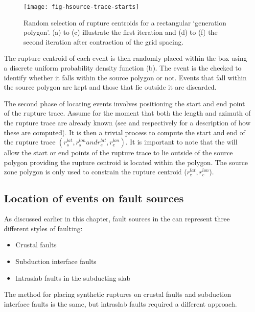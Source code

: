 \begin{figure}
\begin{center}
\texttt{[image: fig-hsource-trace-starts]}
\end{center}
\caption{Random selection of rupture centroids for a
rectangular `generation polygon'. (a) to (c) illustrate the first
iteration and (d) to (f) the second iteration after contraction of
the grid spacing.} \label{fig:source-trace-starts}
\end{figure}

The rupture centroid of each event is then randomly placed within the box 
using a discrete uniform probability density function
(b). The event is the checked to identify whether 
it falls within the source polygon or not. Events that fall within the source polygon 
are kept and those that lie outside it are discarded. 

The second phase of locating events involves positioning the start and end
point of the rupture trace. Assume for the moment that both the
length and azimuth of the rupture trace are already known (see
 and  respectively
for a description of how these are computed). It is then a trivial
process to compute the start and end of the rupture trace
$(r_s^{lat},r_s^{lon} and r_e^{lat},r_e^{lon})$. It is important to note that the  will allow the 
start or end points of the rupture trace to lie outside of the source polygon 
providing the rupture centroid is located within the polygon. The source zone polygon 
is only used to constrain the rupture centroid ($r_c^{lat},r_c^{lon}$).

\subsection{Location of events on fault sources}

As discussed earlier in this chapter, fault sources in the  can represent three different styles of faulting:

\begin{itemize}
\item Crustal faults
\item Subduction interface faults
\item Intraslab faults in the subducting slab
\end{itemize}

The method for placing synthetic ruptures on crustal faults and subduction interface faults is the same, but intraslab faults required a 
different approach. \\


